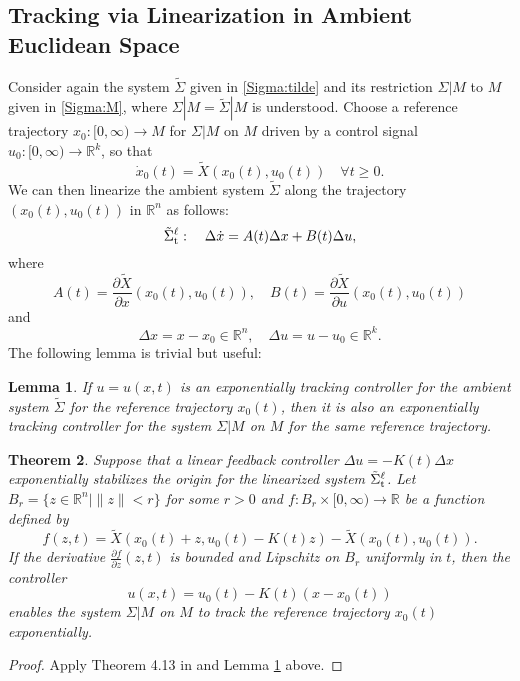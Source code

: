 \documentclass[letterpaper, 10 pt, conference]{ieeeconf}  %
\newtheorem{theorem}{Theorem}[section]
\newtheorem{lemma}[theorem]{Lemma}
\newcommand{\dimu}{{k}}
\begin{document}
\subsection{Tracking via Linearization in Ambient Euclidean Space}
Consider again the system $\tilde \Sigma$ given in \eqref{Sigma:tilde} and its restriction $\Sigma | M$ to $M$ given in \eqref{Sigma:M}, where  $\Sigma | M =\tilde  \Sigma | M$ is understood. Choose a reference trajectory $x_0: [0,\infty) \rightarrow M$ for $\Sigma |M$ on $M$ driven by a control signal $u_0: [0,\infty) \rightarrow \mathbb R^\dimu$, so that 
\[
\dot x_0(t) = \tilde X(x_0(t), u_0(t)) \quad \forall t\geq 0.
\]
We can then linearize the ambient system $\tilde \Sigma$ along the trajectory $(x_0(t), u_0(t))$  in $\mathbb R^n$ as follows:
\begin{equation}\label{Sigma:tilde:ell:t}
\tilde \Sigma^\ell_{\rm t}: \quad  \Delta \dot x = A(t) \Delta x+  B(t)\Delta u,
\end{equation}
where 
\[
A(t) = \frac{\partial \tilde X}{\partial x}(x_0(t),u_0(t)), \quad B(t) = \frac{\partial \tilde X}{\partial u}(x_0(t),u_0(t)) 
\]
and
\[
\Delta x = x - x_0 \in \mathbb R^n, \quad \Delta u = u - u_0 \in \mathbb R^\dimu.
\]
The following lemma is trivial but useful:
\begin{lemma}\label{lemma:exp:tracking}
If $u = u(x,t)$ is an exponentially tracking controller for the ambient system $\tilde \Sigma$ for the reference trajectory $x_0(t)$, then it is also an exponentially tracking controller for the system $ \Sigma | M$ on $M$ for the same reference trajectory.
\end{lemma}
\begin{theorem}\label{theorem:Khalil}
Suppose that a linear feedback controller   $\Delta u = - K(t)\Delta x$ exponentially stabilizes the origin for the linearized system $\tilde \Sigma_{\rm t}^\ell$.  Let $B_r = \{ z \in \mathbb R^n \mid \| z\| <r\}$ for some $r>0$ and $f:   B_r \times [0,\infty)  \rightarrow \mathbb R$ be a function defined by
\[
f(z,t) = \tilde X( x_0(t) + z, u_0(t) - K(t) z) - \tilde X(x_0(t),u_0(t)).
\]
If the derivative $\frac{\partial f}{\partial z}(z,t)$ is bounded and Lipschitz on $B_r$ uniformly in $t$, then the controller
\[
u(x,t) = u_0(t)  - K(t) (x - x_0(t))
\]
enables the system $\Sigma | M$ on $M$  to track the reference trajectory $x_0(t)$ exponentially. 

\end{theorem}

\begin{proof} 
Apply Theorem 4.13 in \cite{Kh02} and Lemma \ref{lemma:exp:tracking} above.  
\end{proof}
\end{document}
